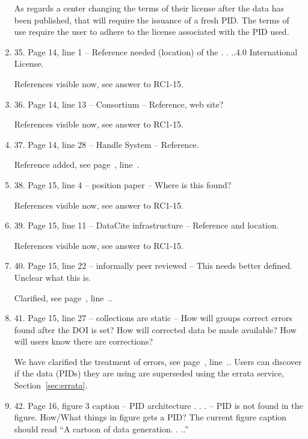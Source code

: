 \documentclass[gmd,manuscript]{copernicus}
\newcommand{\plref}[1]{see page~\pageref{p-#1}, line~\lineref{l-#1}.}
\newenvironment{answer}{\color{blue}}{}
\begin{document}
\begin{enumerate}[label=RC1-\arabic*,leftmargin=*]
\begin{answer}
    As regards a center changing the terms of their license after the
    data has been published, that will require the issuance of a fresh
    PID. The terms of use require the user to adhere to the license
    associated with the PID used.
  \end{answer}
\item 35. Page 14, line 1 -- Reference needed (location) of the . .
  ..4.0 International License.

  \begin{answer}
    References visible now, see answer to RC1-15.
  \end{answer}
\item 36. Page 14, line 13 -- Consortium -- Reference, web site?

  \begin{answer}
    References visible now, see answer to RC1-15.
  \end{answer}
\item 37. Page 14, line 28 -- Handle System -- Reference.

  \begin{answer}
    Reference added, \plref{RC1-37}
  \end{answer}
\item 38. Page 15, line 4 -- position paper -- Where is this found?

  \begin{answer}
    References visible now, see answer to RC1-15.
  \end{answer}
\item 39. Page 15, line 11 -- DataCite infrastructure -- Reference and
  location.

  \begin{answer}
    References visible now, see answer to RC1-15.
  \end{answer}
\item 40. Page 15, line 22 -- informally peer reviewed -- This needs
  better defined. Unclear what this is.

  \begin{answer}
    Clarified, \plref{RC1-40}.
  \end{answer}
\item 41. Page 15, line 27 -- collections are static -- How will groups
  correct errors found after the DOI is set? How will corrected data
  be made available? How will users know there are corrections?

  \begin{answer}
    We have clarified the treatment of errors, \plref{RC1-41}. Users
    can discover if the data (PIDs) they are using are superseded
    using the errata service, Section~\ref{sec:errata}.
  \end{answer}
\item 42. Page 16, figure 3 caption -- PID architecture . . . -- PID is
  not found in the figure. How/What things in figure gets a PID? The
  current figure caption should read ``A cartoon of data generation. .
  ..''


\end{enumerate}
\end{document}
